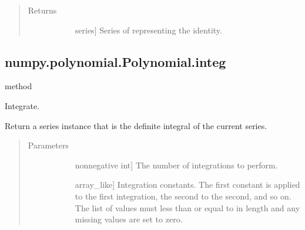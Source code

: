 \documentclass[letterpaper,10pt,english]{sphinxmanual}
\begin{document}
\begin{fulllineitems}
\begin{fulllineitems}
\begin{quote}
\begin{description}
\begin{description}
\end{description}

\item[{Returns}] \leavevmode\begin{description}
\item[{}] \leavevmode{[}series{]}
Series of representing the identity.

\end{description}

\end{description}\end{quote}

\end{fulllineitems}



\subsection{numpy.polynomial.Polynomial.integ}
\label{\detokenize{generated/generated/numpy.polynomial.Polynomial.integ:numpy-polynomial-polynomial-integ}}\label{\detokenize{generated/generated/numpy.polynomial.Polynomial.integ::doc}}
method

\begin{fulllineitems}
\label{\detokenize{generated/generated/numpy.polynomial.Polynomial.integ:numpy.polynomial.Polynomial.integ}}
Integrate.

Return a series instance that is the definite integral of the
current series.
\begin{quote}\begin{description}
\item[{Parameters}] \leavevmode\begin{description}
\item[{}] \leavevmode{[}non\sphinxhyphen{}negative int{]}
The number of integrations to perform.

\item[{}] \leavevmode{[}array\_like{]}
Integration constants. The first constant is applied to the
first integration, the second to the second, and so on. The
list of values must less than or equal to  in length and any
missing values are set to zero.


\end{description}
\end{description}
\end{quote}
\end{fulllineitems}
\end{fulllineitems}
\end{document}
